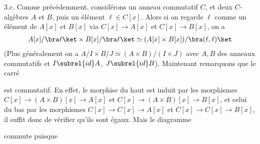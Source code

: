 \documentclass[11pt]{article}
\begin{document}
    \begin{question}{3.c.}
        \label{q3c}
        Comme précédemment, considérons un anneau commutatif $C$, et deux $C$-algèbres $A$ et $B$, puis un élément $\ell \in C[x]$. Alors si on regarde $\ell$ comme un élément de $A[x]$ et $B[x]$ via $C[x] \to A[x]$ et $C[x] \to B[x]$, on a
        \begin{align*}
            A[x]/\bra \ell \ket \times B[x]/\bra \ell \ket \simeq (A[x] \times B[x])/\bra (\ell, \ell) \ket
        \end{align*}
        (Plus généralement on a $A/I \times B/J \simeq (A \times B)/(I \times J)$ avec $A,B$ des anneaux commutatifs et $I \subrel{id} A$, $J \subrel{id} B$). Maintenant remarquons que le carré
        \begin{figure}[H]
            \centering
        \end{figure}
        est commutatif. En effet, le morphise du haut est induit par les morphismes $C[x] \to (A \times B)[x] \to A[x]$ et $C[x] \to (A \times B)[x] \to B[x]$, et celui du bas par les morphismes $C[x] \to C[x] \to A[x]$ et $C[x] \to C[x] \to B[x]$, il suffit donc de vérifier qu'ils sont égaux. Mais le diagramme
        \begin{figure}[H]
            \centering
        \end{figure}
        commute puisque
        \begin{figure}[H]
            \centering

\end{figure}
\end{question}
\end{document}
